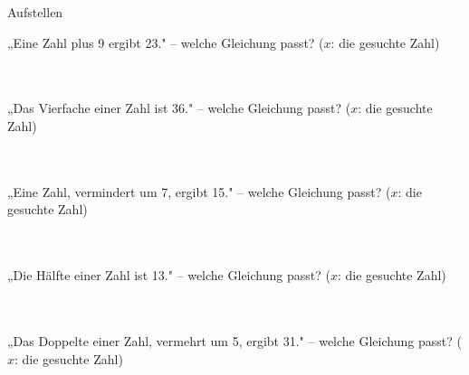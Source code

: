 \setcounter{aufgabe}{18}

\begin{aufgabe}{Aufstellen}
\begin{teile}
\teil „Eine Zahl plus 9 ergibt 23." – welche Gleichung passt? ($x$: die gesuchte Zahl) \\  \\  \\ 
\end{teile}
\begin{teile}
\teil „Das Vierfache einer Zahl ist 36." – welche Gleichung passt? ($x$: die gesuchte Zahl) \\  \\  \\ 
\end{teile}
\begin{teile}
\teil „Eine Zahl, vermindert um 7, ergibt 15." – welche Gleichung passt? ($x$: die gesuchte Zahl) \\  \\  \\ 
\end{teile}
\begin{teile}
\teil „Die Hälfte einer Zahl ist 13." – welche Gleichung passt? ($x$: die gesuchte Zahl) \\  \\  \\ 
\end{teile}
\begin{teile}
\teil „Das Doppelte einer Zahl, vermehrt um 5, ergibt 31." – welche Gleichung passt? ($x$: die gesuchte Zahl) \\  \\  \\ 
\end{teile}

\end{aufgabe}

